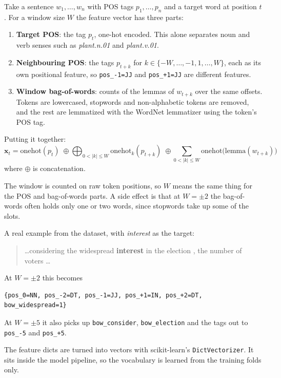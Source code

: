 \documentclass[11pt]{article}
\begin{document}
Take a sentence $w_1, \dots, w_n$ with POS tags $p_1, \dots, p_n$ and a target
word at position $t$. For a window size $W$ the feature vector has three parts:

\begin{enumerate}
\item \textbf{Target POS}: the tag $p_t$, one-hot encoded. This alone
separates noun and verb senses such as \emph{plant.n.01} and
\emph{plant.v.01}.
\item \textbf{Neighbouring POS}: the tags $p_{t+k}$ for
$k \in \{-W, \dots, -1, 1, \dots, W\}$, each as its own positional feature,
so \texttt{pos\_-1=JJ} and \texttt{pos\_+1=JJ} are different features.
\item \textbf{Window bag-of-words}: counts of the lemmas of $w_{t+k}$ over the
same offsets. Tokens are lowercased, stopwords and non-alphabetic tokens are
removed, and the rest are lemmatized with the WordNet lemmatizer using the
token's POS tag.
\end{enumerate}

Putting it together:
\[
\mathbf{x}_t = \mathrm{onehot}(p_t) \;\oplus
\bigoplus_{0<|k|\le W} \mathrm{onehot}_k(p_{t+k}) \;\oplus
\sum_{0<|k|\le W} \mathrm{onehot}\big(\mathrm{lemma}(w_{t+k})\big)
\]
where $\oplus$ is concatenation.

The window is counted on raw token positions, so $W$ means the same thing for
the POS and bag-of-words parts. A side effect is that at $W = \pm 2$ the
bag-of-words often holds only one or two words, since stopwords take up some of
the slots.

A real example from the dataset, with \emph{interest} as the target:

\begin{quote}
\small
\ldots considering the widespread \textbf{interest} in the election , the
number of voters \ldots
\end{quote}

\noindent At $W = \pm 2$ this becomes

{\small
\begin{verbatim}
{pos_0=NN, pos_-2=DT, pos_-1=JJ, pos_+1=IN, pos_+2=DT, bow_widespread=1}
\end{verbatim}
}

\noindent At $W = \pm 5$ it also picks up
\texttt{bow\_consider}, \texttt{bow\_election} and the tags out to
\texttt{pos\_-5} and \texttt{pos\_+5}.

The feature dicts are turned into vectors with scikit-learn's
\texttt{DictVectorizer}. It sits inside the model pipeline, so the vocabulary is
learned from the training folds only.
\end{document}
